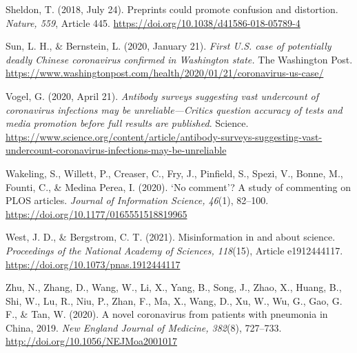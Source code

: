 \documentclass[authordate, perspective, issue]{jote-new-article}
\begin{document}
	Sheldon, T. (2018, July 24). Preprints could promote confusion and distortion. \emph{Nature, 559}, Article 445. \url{https://doi.org/10.1038/d41586-018-05789-4}







	Sun, L. H., \& Bernstein, L. (2020, January 21). \emph{First U.S. case of potentially deadly Chinese coronavirus confirmed in Washington state. }The Washington Post. \url{https://www.washingtonpost.com/health/2020/01/21/coronavirus-us-case/}







	Vogel, G. (2020, April 21). \emph{Antibody surveys suggesting vast undercount of coronavirus infections may be unreliable—Critics question accuracy of tests and media promotion before full results are published}. Science. \url{https://www.science.org/content/article/antibody-surveys-suggesting-vast-undercount-coronavirus-infections-may-be-unreliable}







	Wakeling, S., Willett, P., Creaser, C., Fry, J., Pinfield, S., Spezi, V., Bonne, M., Founti, C., \& Medina Perea, I. (2020). ‘No comment'? A study of commenting on PLOS articles. \emph{Journal of Information Science, 46}(1), 82--100. \url{https://doi.org/10.1177/0165551518819965}







	West, J. D., \& Bergstrom, C. T. (2021). Misinformation in and about science. \emph{Proceedings of the National Academy of Sciences, 118}(15), Article e1912444117. \href{https://doi.org/10.1073/pnas.1912444117}{https://doi.org/10.1073/pnas.1912444117}







	Zhu, N., Zhang, D., Wang, W., Li, X., Yang, B., Song, J., Zhao, X., Huang, B., Shi, W., Lu, R., Niu, P., Zhan, F., Ma, X., Wang, D., Xu, W., Wu, G., Gao, G. F., \& Tan, W. (2020). A novel coronavirus from patients with pneumonia in China, 2019. \emph{New England Journal of Medicine, 382}(8), 727--733. \url{http://doi.org/10.1056/NEJMoa2001017}
\end{document}
